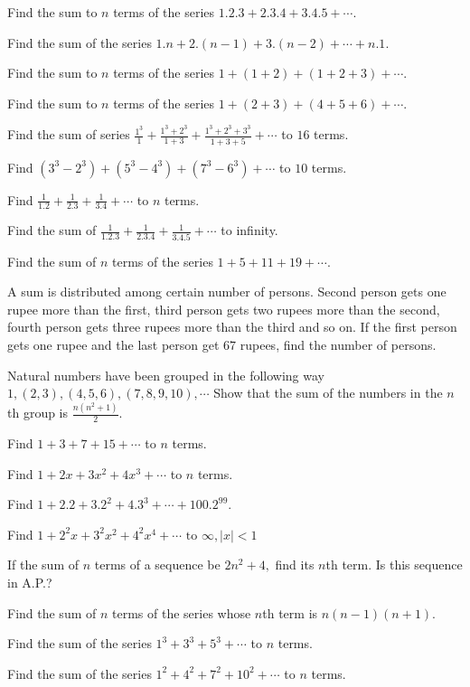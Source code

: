 \item Find the sum to $n$ terms of the series $1.2.3 + 2.3.4 + 3.4.5 + \cdots$.
\item Find the sum of the series $1.n + 2.(n - 1) + 3.(n - 2) + \cdots + n.1$.
\item Find the sum to $n$ terms of the series $1 + (1 + 2) + (1 + 2 + 3) + \cdots$.
\item Find the sum to $n$ terms of the series $1 + (2 + 3) + (4 + 5 + 6) + \cdots$.
\item Find the sum of series $\frac{1^3}{1} + \frac{1^3 + 2^3}{1 + 3} + \frac{1^3 + 2^3 + 3^3}{1 + 3 + 5} + \cdots$ to $16$ terms.
\item Find $(3^3 - 2^3) + (5^3 - 4^3) + (7^3 - 6^3) + \cdots$ to $10$ terms.
\item Find $\frac{1}{1.2} + \frac{1}{2.3} + \frac{1}{3.4} + \cdots$ to $n$ terms.
\item Find the sum of $\frac{1}{1.2.3} + \frac{1}{2.3.4} + \frac{1}{3.4.5} + \cdots$ to infinity.
\item Find the sum of $n$ terms of the series $1 + 5 + 11 + 19 + \cdots$.
\item A sum is distributed among certain number of persons. Second person gets one rupee more than the first, third person
  gets two rupees more than the second, fourth person gets three rupees more than the third and so on. If the first person gets one
  rupee and the last person get $67$ rupees, find the number of persons.
\item Natural numbers have been grouped in the following way $1, (2, 3), (4, 5, 6), (7, 8, 9, 10), \cdots$ Show that the
  sum of the numbers in the $n$th group is $\frac{n(n^2 + 1)}{2}$.
\item Find $1 + 3 + 7 + 15 + \cdots$ to $n$ terms.
\item Find $1 + 2x + 3x^2 + 4x^3 + \cdots$ to $n$ terms.
\item Find $1 + 2.2 + 3.2^2 + 4.3^3 + \cdots + 100.2^{99}$.
\item Find $1 + 2^2x + 3^2x^2 + 4^2x^4 + \cdots \text{~to~}\infty, |x| < 1$
\item If the sum of $n$ terms of a sequence be $2n^2 + 4,$ find its $n$th term. Is this sequence in A.P.?
\item Find the sum of $n$ terms of the series whose $n$th term is $n(n - 1)(n + 1)$.
\item Find the sum of the series $1^3 + 3^3 + 5^3 + \cdots$ to $n$ terms.
\item Find the sum of the series $1^2 + 4^2 + 7^2 + 10^2 + \cdots$ to $n$ terms.
